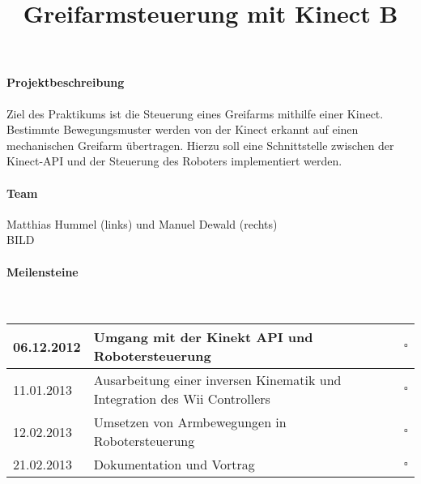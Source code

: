 \documentclass[10pt,a4paper]{scrartcl}
\title{Greifarmsteuerung mit Kinect B}
\date{}
\begin{document}
\maketitle
\paragraph*{Projektbeschreibung}
Ziel des Praktikums ist die Steuerung eines Greifarms mithilfe einer Kinect. Bestimmte Bewegungsmuster werden von der Kinect erkannt auf einen mechanischen Greifarm übertragen. Hierzu soll eine Schnittstelle zwischen der Kinect-API und der Steuerung des Roboters implementiert werden.
\paragraph*{Team} Matthias Hummel (links) und Manuel Dewald (rechts)\\
BILD
\paragraph*{Meilensteine}\textbf{}\\

\begin{tabular}{|l|l|c|}
\hline 
06.12.2012 & Umgang mit der Kinekt API und Robotersteuerung & $\square$\\ 
\hline 
11.01.2013 & Ausarbeitung einer inversen Kinematik und Integration des Wii Controllers & $\square$\\ 
\hline 
12.02.2013 & Umsetzen von Armbewegungen in Robotersteuerung & $\square$\\ 
\hline 
21.02.2013 & Dokumentation und Vortrag & $\square$\\
\hline
\end{tabular} 
\end{document}
